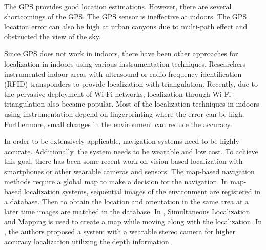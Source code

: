 The GPS provides good location estimations. 
However, there are several shortcomings of the GPS.
The GPS sensor is ineffective at indoors.
The GPS location error can also be high at urban canyons due to multi-path effect and obstructed the view of the sky.

Since GPS does not work in indoors, there have been other approaches for localization in indoors using various instrumentation techniques. 
Researchers instrumented indoor areas with ultrasound \cite{drishti} or radio frequency identification (RFID) \cite{rfid} transponders to provide localization with triangulation.
Recently, due to the pervasive deployment of Wi-Fi networks, localization through Wi-Fi triangulation also became popular.  
Most of the localization techniques in indoors using instrumentation depend on fingerprinting where the error can be high.
Furthermore, small changes in the environment can reduce the accuracy.

In order to be extensively applicable, navigation systems need to be highly accurate.
Additionally, the system needs to be wearable and low cost.
To achieve this goal, there has been some recent work on vision-based localization with smartphones or other wearable cameras and sensors.
The map-based navigation methods \cite{online,map,map2} require a global map to make a decision for the navigation. 
In map-based localization systems, sequential images of the environment are registered in a database.
Then to obtain the location and orientation in the same area at a later time images are matched in the database.
In \cite{fly,fly2,fly3}, Simultaneous Localization and Mapping is used to create a map while moving along with the localization.
In \cite{visual}, the authors proposed a system with a wearable stereo camera for higher accuracy localization utilizing the depth information.

